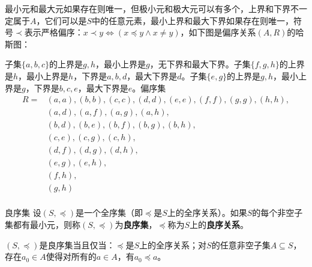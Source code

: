 最小元和最大元如果存在则唯一，但极小元和极大元可以有多个，上界和下界不一定属于$A$，它们可以是$S$中的任意元素，最小上界和最大下界如果存在则唯一，符号$\prec$表示严格偏序：$x \prec y \Leftrightarrow (x \preccurlyeq y \land x \neq y)$，如下图是偏序关系$(A,R)$的哈斯图：
\begin{figure}[!ht]
\centering
{}%
\end{figure}
子集$\{a,b,c\}$的上界是$g,h$，最小上界是$g$，无下界和最大下界。子集$\{f,g,h\}$的上界是$h$，最小上界是$h$，下界是$a,b,d$，最大下界是$d$。子集$\{e,g\}$的上界是$g,h$，最小上界是$g$，下界是$b,c,e$，最大下界是$e$。偏序集
\begin{align*}
R = &(a,a), (b,b), (c,c), (d,d), (e,e), (f,f), (g,g), (h,h),\\
&(a,d), (a,f), (a,g), (a,h),\\
&(b,d), (b,e), (b,f), (b,g), (b,h),\\
&(c,e), (c,g), (c,h),\\
&(d,f), (d,g), (d,h),\\
&(e,g), (e,h),\\
&(f,h),\\
&(g,h)\\
\end{align*}
\begin{definition}{良序集}{}
设$(S, \preccurlyeq)$是一个全序集（即$\preccurlyeq$是$S$上的全序关系）。如果$S$的每个非空子集都有最小元，则称$(S, \preccurlyeq)$为\textbf{良序集}，$\preceq$称为$S$上的\textbf{良序关系}。
\end{definition}
$(S, \preccurlyeq)$是良序集当且仅当：$\preccurlyeq$是$S$上的全序关系；对$S$的任意非空子集$A \subseteq S$，存在$a_0 \in A$使得对所有的$a \in A$，有$a_0 \preccurlyeq a$。

